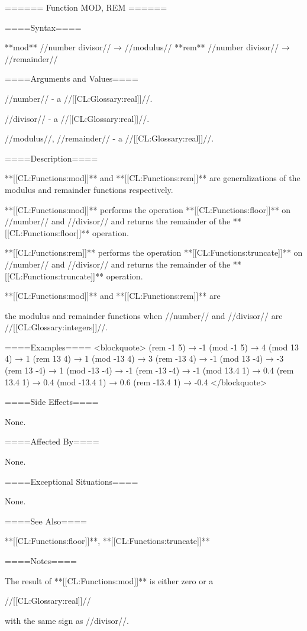 ====== Function MOD, REM ======

====Syntax====

**mod** //number divisor// → //modulus// **rem** //number divisor// → //remainder//

====Arguments and Values====

//number// - a //[[CL:Glossary:real]]//.

//divisor// - a //[[CL:Glossary:real]]//.

//modulus//, //remainder// - a //[[CL:Glossary:real]]//.

====Description====

**[[CL:Functions:mod]]** and **[[CL:Functions:rem]]** are generalizations of the modulus and remainder functions respectively.

**[[CL:Functions:mod]]** performs the operation **[[CL:Functions:floor]]** on //number// and //divisor// and returns the remainder of the **[[CL:Functions:floor]]** operation.

**[[CL:Functions:rem]]** performs the operation **[[CL:Functions:truncate]]** on //number// and //divisor// and returns the remainder of the **[[CL:Functions:truncate]]** operation.

**[[CL:Functions:mod]]** and **[[CL:Functions:rem]]** are

the modulus and remainder functions when //number// and //divisor// are //[[CL:Glossary:integers]]//.

====Examples==== <blockquote> (rem -1 5) → -1 (mod -1 5) → 4 (mod 13 4) → 1 (rem 13 4) → 1 (mod -13 4) → 3 (rem -13 4) → -1 (mod 13 -4) → -3 (rem 13 -4) → 1 (mod -13 -4) → -1 (rem -13 -4) → -1 (mod 13.4 1) → 0.4 (rem 13.4 1) → 0.4 (mod -13.4 1) → 0.6 (rem -13.4 1) → -0.4 </blockquote>

====Side Effects====

None.

====Affected By====

None.

====Exceptional Situations====

None.

====See Also====

**[[CL:Functions:floor]]**, **[[CL:Functions:truncate]]**

====Notes====

The result of **[[CL:Functions:mod]]** is either zero or a

//[[CL:Glossary:real]]//

with the same sign as //divisor//.

